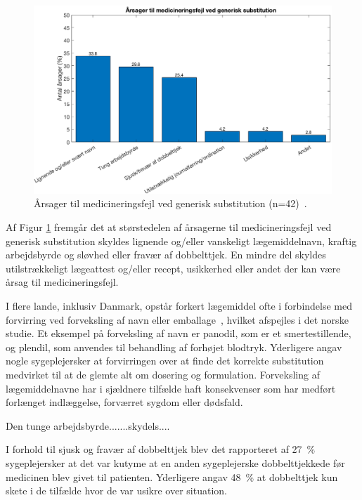 \begin{figure}[H]\centering	\includegraphics[width=1\textwidth]{billeder/GenSub1.png} 
	\caption{Årsager til medicineringsfejl ved generisk substitution (n=42)~\citep{Hakonsen2010}.}	\label{fig:GeneriskSubstitution1}  
\end{figure}

Af Figur \ref{fig:GeneriskSubstitution1} fremgår det at størstedelen af årsagerne til medicineringsfejl ved generisk substitution skyldes lignende og/eller vanskeligt lægemiddelnavn, kraftig arbejdsbyrde og sløvhed eller fravær af dobbelttjek. En mindre del skyldes utilstrækkeligt lægeattest og/eller recept, usikkerhed eller andet der kan være årsag til medicineringsfejl. 

I flere lande, inklusiv Danmark, opstår forkert lægemiddel ofte i forbindelse med forvirring ved  forveksling af navn eller emballage~\citep{DanskSelskabforPatientsikkerhed2009}, hvilket afspejles i det norske studie. Et eksempel på forveksling af navn er panodil, som er et smertestillende, og plendil, som anvendes til behandling af forhøjet blodtryk. Yderligere angav nogle sygeplejersker at forvirringen over at finde det korrekte substitution medvirket til at de glemte alt om dosering og formulation. Forveksling af lægemiddelnavne har i sjældnere tilfælde haft konsekvenser som har medført forlænget indlæggelse, forværret sygdom eller dødsfald.~\citep{DanskSelskabforPatientsikkerhed2009} 


Den tunge arbejdsbyrde.......skydels....

I forhold til sjusk og fravær af dobbelttjek blev det rapporteret af 27~\% sygeplejersker at det var kutyme at en anden sygeplejerske dobbelttjekkede før medicinen blev givet til patienten. Yderligere angav 48~\% at dobbelttjek kun skete i de tilfælde hvor de var usikre over situation. 

